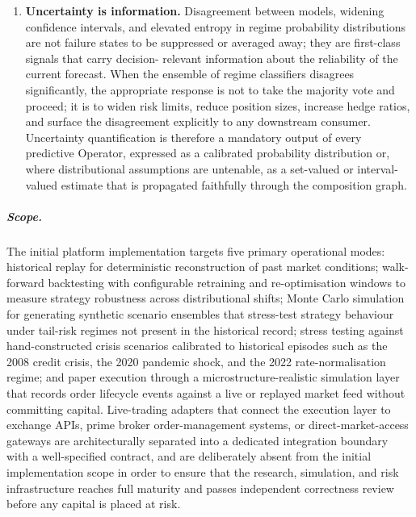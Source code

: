 \documentclass[12pt,openany]{book}
\numberwithin{equation}{chapter}
\theoremstyle{plain}
\theoremstyle{definition}
\theoremstyle{remark}
\begin{document}
\begin{enumerate}
    \item \textbf{Uncertainty is information.} Disagreement between models,
          widening confidence intervals, and elevated entropy in regime
          probability distributions are not failure states to be suppressed
          or averaged away; they are first-class signals that carry decision-
          relevant information about the reliability of the current forecast.
          When the ensemble of regime classifiers disagrees significantly,
          the appropriate response is not to take the majority vote and
          proceed; it is to widen risk limits, reduce position sizes, increase
          hedge ratios, and surface the disagreement explicitly to any
          downstream consumer. Uncertainty quantification is therefore a
          mandatory output of every predictive Operator, expressed as a
          calibrated probability distribution or, where distributional
          assumptions are untenable, as a set-valued or interval-valued
          estimate that is propagated faithfully through the composition graph.
\end{enumerate}

\subparagraph{Scope.}
The initial platform implementation targets five primary operational modes:
historical replay for deterministic reconstruction of past market conditions;
walk-forward backtesting with configurable retraining and re-optimisation
windows to measure strategy robustness across distributional shifts; Monte
Carlo simulation for generating synthetic scenario ensembles that stress-test
strategy behaviour under tail-risk regimes not present in the historical
record; stress testing against hand-constructed crisis scenarios calibrated to
historical episodes such as the 2008 credit crisis, the 2020 pandemic shock,
and the 2022 rate-normalisation regime; and paper execution through a
microstructure-realistic simulation layer that records order lifecycle events
against a live or replayed market feed without committing capital. Live-trading
adapters that connect the execution layer to exchange APIs, prime broker
order-management systems, or direct-market-access gateways are architecturally
separated into a dedicated integration boundary with a well-specified contract,
and are deliberately absent from the initial implementation scope in order to
ensure that the research, simulation, and risk infrastructure reaches full
maturity and passes independent correctness review before any capital is placed
at risk.

\end{document}
